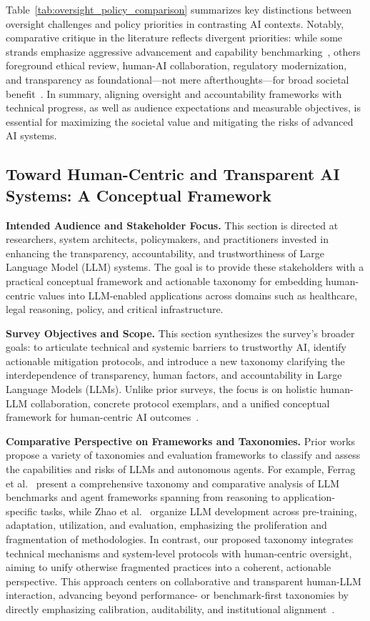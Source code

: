 \documentclass[sigconf]{acmart}
\begin{document}
Table~\ref{tab:oversight_policy_comparison} summarizes key distinctions between oversight challenges and policy priorities in contrasting AI contexts. Notably, comparative critique in the literature reflects divergent priorities: while some strands emphasize aggressive advancement and capability benchmarking~\cite{ref21,ref23,ref55}, others foreground ethical review, human-AI collaboration, regulatory modernization, and transparency as foundational—not mere afterthoughts—for broad societal benefit~\cite{ref25,ref46,ref52,ref53}. In summary, aligning oversight and accountability frameworks with technical progress, as well as audience expectations and measurable objectives, is essential for maximizing the societal value and mitigating the risks of advanced AI systems.

\subsection{Toward Human-Centric and Transparent AI Systems: A Conceptual Framework}

\textbf{Intended Audience and Stakeholder Focus.} This section is directed at researchers, system architects, policymakers, and practitioners invested in enhancing the transparency, accountability, and trustworthiness of Large Language Model (LLM) systems. The goal is to provide these stakeholders with a practical conceptual framework and actionable taxonomy for embedding human-centric values into LLM-enabled applications across domains such as healthcare, legal reasoning, policy, and critical infrastructure.

\textbf{Survey Objectives and Scope.} This section synthesizes the survey’s broader goals: to articulate technical and systemic barriers to trustworthy AI, identify actionable mitigation protocols, and introduce a new taxonomy clarifying the interdependence of transparency, human factors, and accountability in Large Language Models (LLMs). Unlike prior surveys, the focus is on holistic human-LLM collaboration, concrete protocol exemplars, and a unified conceptual framework for human-centric AI outcomes~\cite{ref52,ref55}. 

\textbf{Comparative Perspective on Frameworks and Taxonomies.} Prior works propose a variety of taxonomies and evaluation frameworks to classify and assess the capabilities and risks of LLMs and autonomous agents. For example, Ferrag et al.~\cite{ref55} present a comprehensive taxonomy and comparative analysis of LLM benchmarks and agent frameworks spanning from reasoning to application-specific tasks, while Zhao et al.~\cite{ref42} organize LLM development across pre-training, adaptation, utilization, and evaluation, emphasizing the proliferation and fragmentation of methodologies. In contrast, our proposed taxonomy integrates technical mechanisms and system-level protocols with human-centric oversight, aiming to unify otherwise fragmented practices into a coherent, actionable perspective. This approach centers on collaborative and transparent human-LLM interaction, advancing beyond performance- or benchmark-first taxonomies by directly emphasizing calibration, auditability, and institutional alignment~\cite{ref52,ref55}.
\end{document}

